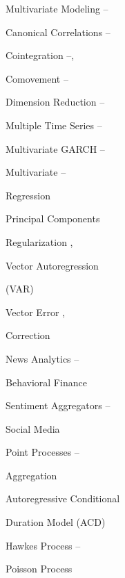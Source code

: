 \begin{multicols}{2}
\noindent Multivariate Modeling \hfill \pageref{in:multimod1}--\pageref{in:multimod2} \par
\twoindent Canonical Correlations \hfill \pageref{in:cancor1}--\pageref{in:cancor2} \par
\twoindent Cointegration \hfill \pageref{in:coint1}--\pageref{in:coint2}, \pageref{in:coint3} \par
\twoindent Comovement \hfill \pageref{in:comove1}--\pageref{in:comove2} \par
\twoindent Dimension Reduction \hfill \pageref{in:dimred1}--\pageref{in:dimred2} \par
\twoindent Multiple Time Series \hfill \pageref{in:mts1}--\pageref{in:mts2} \par
\twoindent Multivariate GARCH \hfill \pageref{in:multgarch1}--\pageref{in:multgarch2} \par
\twoindent Multivariate \hfill \pageref{in:multreg1}--\pageref{in:multreg2} \par \hspace{0.75cm} Regression \par 
\twoindent Principal Components \hfill \pageref{in:pca} \par
\twoindent Regularization \hfill \pageref{in:regz1}, \pageref{in:regz2} \par
\twoindent Vector Autoregression \hfill \pageref{in:var} \par \hspace{0.75cm} (VAR) \par 
\twoindent Vector Error \hfill \pageref{in:vec1}, \pageref{in:vec2} \par \hspace{0.75cm} Correction \par 
\vspace{\baselineskip}


\noindent News Analytics \hfill \pageref{in:newsan1}--\pageref{in:newsan2} \par
\twoindent Behavioral Finance \hfill \pageref{in:behave1} \par
\twoindent Sentiment Aggregators \hfill \pageref{in:sentag1}--\pageref{in:sentag2} \par
\twoindent Social Media \hfill \pageref{in:social} \par
\vspace{\baselineskip}


\noindent Point Processes \hfill \pageref{in:point1}--\pageref{in:point2} \par
\twoindent Aggregation \hfill \pageref{in:agg} \par
\twoindent Autoregressive Conditional \hfill \pageref{in:acd} \par \hspace{0.75cm} Duration Model (ACD) \par 
\twoindent Hawkes Process \hfill \pageref{in:hawk1}--\pageref{in:hawk2} \par
\twoindent Poisson Process \hfill \pageref{in:poisson} \par
\vspace{\baselineskip}



\end{multicols}
